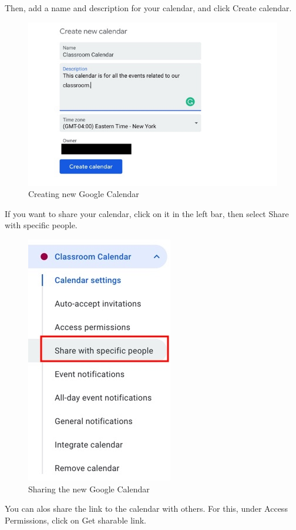 \documentclass[]{book}
\begin{document}
Then, add a name and description for your calendar, and click Create calendar.

\begin{figure}
\centering
\includegraphics{./images/new_gcalendar_2.jpg}
\caption{Creating new Google Calendar}
\end{figure}

If you want to share your calendar, click on it in the left bar, then select Share with specific people.

\begin{figure}
\centering
\includegraphics{./images/sharing_new_gcalendar.jpg}
\caption{Sharing the new Google Calendar}
\end{figure}

You can alos share the link to the calendar with others. For this, under Access Permissions, click on Get sharable link.
\end{document}
